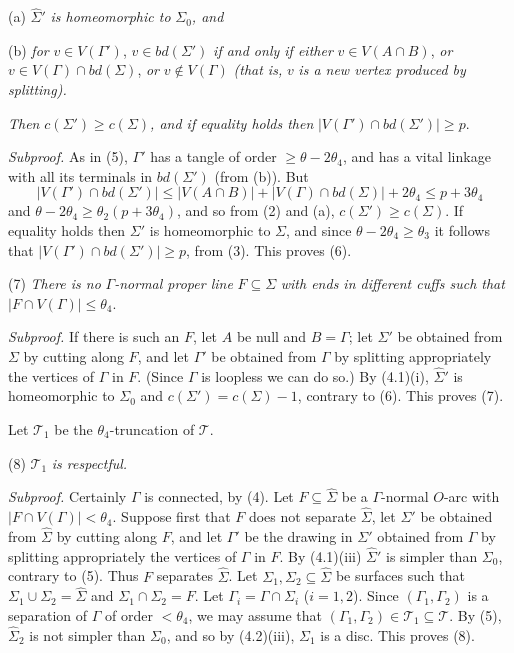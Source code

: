 \hspace*{12pt}(a) $\hat{\Sigma}'$ \textit{is homeomorphic to} $\Sigma_0$\textit{, and}

\hspace*{12pt}(b) \textit{for} $v \in V(\Gamma')$, $v \in bd(\Sigma')$ \textit{if and only if either} $v \in V(A \cap B)$, \textit{or} $v \in V(\Gamma) \cap bd(\Sigma)$, \textit{or} $v \notin V(\Gamma)$ \textit{(that is,} $v$ \textit{is a new vertex produced by splitting).}

\textit{Then} $c(\Sigma') \ge c(\Sigma)$\textit{, and if equality holds then} $|V(\Gamma') \cap bd(\Sigma')| \ge p$.

\textit{Subproof.} As in (5), $\Gamma'$ has a tangle of order $\ge \theta - 2\theta_4$, and has a vital linkage with all its terminals in $bd(\Sigma')$ (from (b)). But
\begin{equation*}
|V(\Gamma') \cap bd(\Sigma')| \le |V(A \cap B)| + |V(\Gamma) \cap bd(\Sigma)| + 2\theta_4 \le p + 3\theta_4
\end{equation*}
and $\theta - 2\theta_4 \ge \theta_2(p + 3\theta_4)$, and so from (2) and (a), $c(\Sigma') \ge c(\Sigma)$. If equality holds then $\Sigma'$ is homeomorphic to $\Sigma$, and since $\theta - 2\theta_4 \ge \theta_3$ it follows that $|V(\Gamma') \cap bd(\Sigma')| \ge p$, from (3). This proves (6).

\hspace*{12pt}(7) \textit{There is no} $\Gamma$\textit{-normal proper line} $F \subseteq \Sigma$ \textit{with ends in different cuffs such that} $|F \cap V(\Gamma)| \le \theta_4$.

\textit{Subproof.} If there is such an $F$, let $A$ be null and $B = \Gamma$; let $\Sigma'$ be obtained from $\Sigma$ by cutting along $F$, and let $\Gamma'$ be obtained from $\Gamma$ by splitting appropriately the vertices of $\Gamma$ in $F$. (Since $\Gamma$ is loopless we can do so.) By (4.1)(i), $\hat{\Sigma}'$ is homeomorphic to $\Sigma_0$ and $c(\Sigma') = c(\Sigma) - 1$, contrary to (6). This proves (7).

Let $\mathcal{T}_1$ be the $\theta_4$-truncation of $\mathcal{T}$.

\hspace*{12pt}(8) $\mathcal{T}_1$ \textit{is respectful.}

\textit{Subproof.} Certainly $\Gamma$ is connected, by (4). Let $F \subseteq \hat{\Sigma}$ be a $\Gamma$-normal $O$-arc with $|F \cap V(\Gamma)| < \theta_4$. Suppose first that $F$ does not separate $\hat{\Sigma}$, let $\Sigma'$ be obtained from $\hat{\Sigma}$ by cutting along $F$, and let $\Gamma'$ be the drawing in $\Sigma'$ obtained from $\Gamma$ by splitting appropriately the vertices of $\Gamma$ in $F$. By (4.1)(iii) $\hat{\Sigma}'$ is simpler than $\Sigma_0$, contrary to (5). Thus $F$ separates $\hat{\Sigma}$. Let $\Sigma_1, \Sigma_2 \subseteq \hat{\Sigma}$ be surfaces such that $\Sigma_1 \cup \Sigma_2 = \hat{\Sigma}$ and $\Sigma_1 \cap \Sigma_2 = F$. Let $\Gamma_i = \Gamma \cap \Sigma_i$ ($i = 1, 2$). Since $(\Gamma_1, \Gamma_2)$ is a separation of $\Gamma$ of order $< \theta_4$, we may assume that $(\Gamma_1, \Gamma_2) \in \mathcal{T}_1 \subseteq \mathcal{T}$. By (5), $\hat{\Sigma}_2$ is not simpler than $\Sigma_0$, and so by (4.2)(iii), $\Sigma_1$ is a disc. This proves (8).
